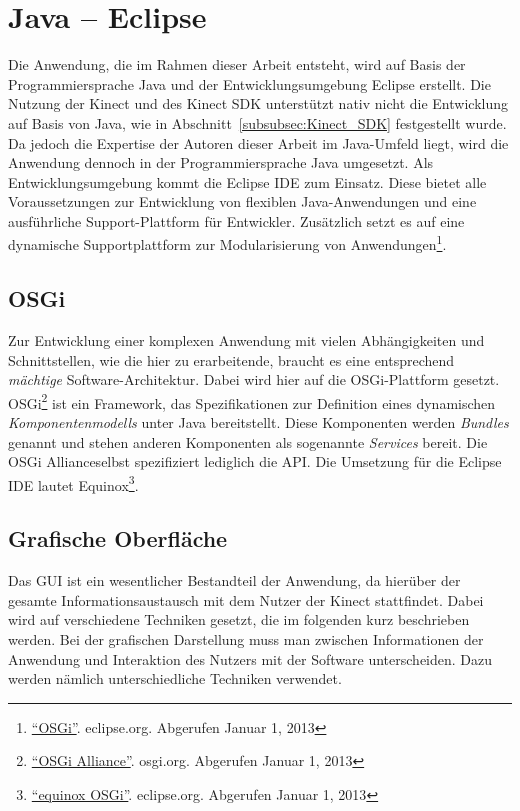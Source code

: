 \section{Java -- Eclipse}
Die Anwendung, die im Rahmen dieser Arbeit entsteht, wird auf Basis der Programmiersprache Java und der Entwicklungsumgebung Eclipse erstellt.
Die Nutzung der Kinect und des Kinect SDK unterst\"utzt nativ nicht die Entwicklung auf Basis von Java, wie in Abschnitt~\ref{subsubsec:Kinect_SDK}
festgestellt wurde. Da jedoch die Expertise der Autoren dieser Arbeit im Java-Umfeld liegt, wird die Anwendung dennoch in der Programmiersprache Java umgesetzt.
\newline
Als Entwicklungsumgebung kommt die \gls{Eclipse} \acrshort{IDE} zum Einsatz. Diese bietet alle Voraussetzungen zur Entwicklung von flexiblen Java-Anwendungen und eine
ausf\"uhrliche Support-Plattform f\"ur Entwickler. Zus\"atzlich setzt es auf eine dynamische Supportplattform zur Modularisierung von Anwendungen\footnote{\href{http://eclipse.org/osgi/}{\enquote{OSGi}}. eclipse.org. Abgerufen Januar 1, 2013}.

\subsection{OSGi}
\label{subsec:OSGi}
Zur Entwicklung einer komplexen Anwendung mit vielen Abh\"angigkeiten und Schnittstellen, wie die hier zu erarbeitende, braucht es eine entsprechend \textit{m\"achtige} Software-Architektur. Dabei wird hier auf die OSGi-Plattform gesetzt.
OSGi\footnote{\href{http://www.osgi.org/Technology/HomePage}{\enquote{OSGi Alliance}}. osgi.org. Abgerufen Januar 1, 2013} ist ein \gls{Framework}, das Spezifikationen zur Definition eines dynamischen \textit{Komponentenmodells} unter Java bereitstellt.
Diese Komponenten werden \textit{Bundles} genannt und stehen anderen Komponenten als sogenannte \textit{Services} bereit.
Die OSGi Alliance\footnotemark[1] selbst spezifiziert lediglich die \gls{API}. Die Umsetzung f\"ur die Eclipse \acrshort{IDE} lautet \gls{Equinox}\footnote{\href{http://eclipse.org/equinox/}{\enquote{equinox OSGi}}. eclipse.org. Abgerufen Januar 1, 2013}.

\subsection{Grafische Oberfl\"ache}
Das \gls{GUI} ist ein wesentlicher Bestandteil der Anwendung, da hier\"uber der gesamte Informationsaustausch mit dem Nutzer der Kinect stattfindet.
Dabei wird auf verschiedene Techniken gesetzt, die im folgenden kurz beschrieben werden.
\newline
Bei der grafischen Darstellung muss man zwischen Informationen der Anwendung und Interaktion des Nutzers mit der Software unterscheiden. Dazu werden n\"amlich unterschiedliche Techniken verwendet.

